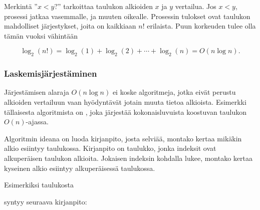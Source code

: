 Merkintä ''$x<y?$'' tarkoittaa taulukon alkioiden
$x$ ja $y$ vertailua.
Jos $x<y$, prosessi jatkaa vasemmalle,
ja muuten oikealle.
Prosessin tulokset ovat taulukon mahdolliset
järjestykset, joita on kaikkiaan $n!$ erilaista.
Puun korkeuden tulee olla tämän vuoksi vähintään

\[ \log_2(n!) = \log_2(1)+\log_2(2)+\cdots+\log_2(n) = O(n \log n).\]

\subsubsection{Laskemisjärjestäminen}


Järjestämisen alaraja $O(n \log n)$ ei koske algoritmeja,
jotka eivät perustu alkioiden vertailuun vaan hyödyntävät
jotain muuta tietoa alkioista.
Esimerkki tällaisesta algoritmista on
, joka järjestää
kokonaisluvuista koostuvan taulukon $O(n)$-ajassa.

Algoritmin ideana on luoda kirjanpito, josta selviää,
montako kertaa mikäkin alkio esiintyy taulukossa.
Kirjanpito on taulukko, jonka indeksit ovat alkuperäisen
taulukon alkioita.
Jokaisen indeksin kohdalla lukee, montako kertaa
kyseinen alkio esiintyy alkuperäisessä taulukossa.

Esimerkiksi taulukosta

\begin{center}
\end{center}

syntyy seuraava kirjanpito:

\begin{center}
\end{center}

